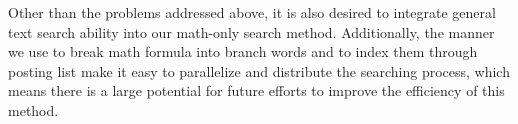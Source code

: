 Other than the problems addressed above, it is also desired to integrate general text search ability into our math-only search method. 
Additionally, the manner we use to break math formula into branch words and to index them through posting list make it easy to parallelize and distribute the searching process,
which means there is a large potential for future efforts to improve the efficiency of this method.
